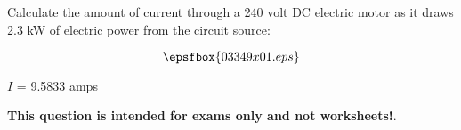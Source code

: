 

Calculate the amount of current through a 240 volt DC electric motor as it draws 2.3 kW of electric power from the circuit source:

$$\epsfbox{03349x01.eps}$$







$I$ = 9.5833 amps







{\bf This question is intended for exams only and not worksheets!}.



